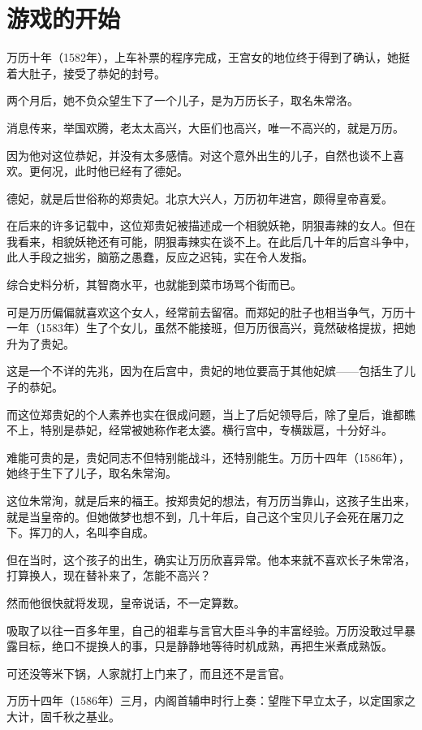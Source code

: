 \section{游戏的开始}
\ifnum{}
	\begin{multicols}{\theparacolNo}
\fi
万历十年（1582年），上车补票的程序完成，王宫女的地位终于得到了确认，她挺着大肚子，接受了恭妃的封号。

两个月后，她不负众望生下了一个儿子，是为万历长子，取名朱常洛。

消息传来，举国欢腾，老太太高兴，大臣们也高兴，唯一不高兴的，就是万历。

因为他对这位恭妃，并没有太多感情。对这个意外出生的儿子，自然也谈不上喜欢。更何况，此时他已经有了德妃。

德妃，就是后世俗称的郑贵妃。北京大兴人，万历初年进宫，颇得皇帝喜爱。

在后来的许多记载中，这位郑贵妃被描述成一个相貌妖艳，阴狠毒辣的女人。但在我看来，相貌妖艳还有可能，阴狠毒辣实在谈不上。在此后几十年的后宫斗争中，此人手段之拙劣，脑筋之愚蠢，反应之迟钝，实在令人发指。

综合史料分析，其智商水平，也就能到菜市场骂个街而已。

可是万历偏偏就喜欢这个女人，经常前去留宿。而郑妃的肚子也相当争气，万历十一年（1583年）生了个女儿，虽然不能接班，但万历很高兴，竟然破格提拔，把她升为了贵妃。

这是一个不详的先兆，因为在后宫中，贵妃的地位要高于其他妃嫔——包括生了儿子的恭妃。

而这位郑贵妃的个人素养也实在很成问题，当上了后妃领导后，除了皇后，谁都瞧不上，特别是恭妃，经常被她称作老太婆。横行宫中，专横跋扈，十分好斗。

难能可贵的是，贵妃同志不但特别能战斗，还特别能生。万历十四年（1586年），她终于生下了儿子，取名朱常洵。

这位朱常洵，就是后来的福王。按郑贵妃的想法，有万历当靠山，这孩子生出来，就是当皇帝的。但她做梦也想不到，几十年后，自己这个宝贝儿子会死在屠刀之下。挥刀的人，名叫李自成。

但在当时，这个孩子的出生，确实让万历欣喜异常。他本来就不喜欢长子朱常洛，打算换人，现在替补来了，怎能不高兴？

然而他很快就将发现，皇帝说话，不一定算数。

吸取了以往一百多年里，自己的祖辈与言官大臣斗争的丰富经验。万历没敢过早暴露目标，绝口不提换人的事，只是静静地等待时机成熟，再把生米煮成熟饭。

可还没等米下锅，人家就打上门来了，而且还不是言官。

万历十四年（1586年）三月，内阁首辅申时行上奏：望陛下早立太子，以定国家之大计，固千秋之基业。


\end{multicols}
